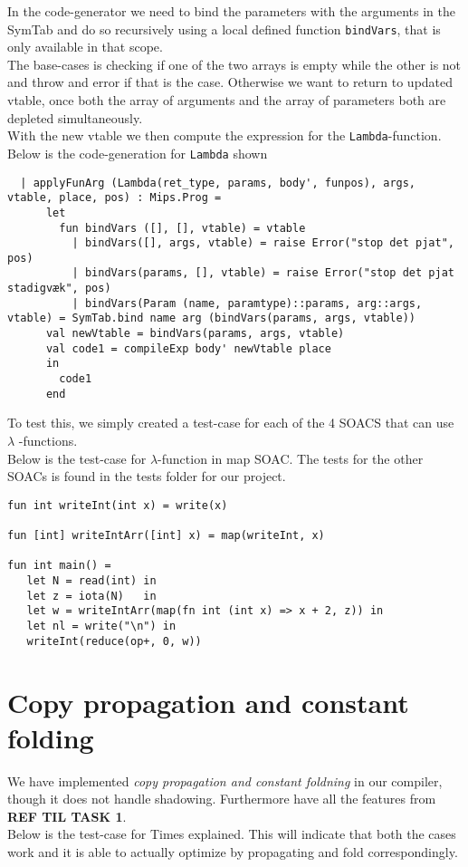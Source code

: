 \documentclass[paper=a4, fontsize=11pt]{scrartcl} %
\numberwithin{equation}{section} %
\numberwithin{figure}{section} %
\numberwithin{table}{section} %
\begin{document}
In the code-generator we need to bind the parameters with the arguments in the SymTab and do so recursively using a local defined function \verb"bindVars", that is only available in that scope.\\
The base-cases is checking if one of the two arrays is empty while the other is not and throw and error if that is the case. Otherwise we want to return to updated vtable, once both the array of arguments and the array of parameters both are depleted simultaneously.\\
With the new vtable we then compute the expression for the \verb"Lambda"-function.\\
Below is the code-generation for \verb"Lambda" shown
\begin{lstlisting}
  | applyFunArg (Lambda(ret_type, params, body', funpos), args, vtable, place, pos) : Mips.Prog = 
      let 
        fun bindVars ([], [], vtable) = vtable
          | bindVars([], args, vtable) = raise Error("stop det pjat", pos)
          | bindVars(params, [], vtable) = raise Error("stop det pjat stadigvæk", pos)
          | bindVars(Param (name, paramtype)::params, arg::args, vtable) = SymTab.bind name arg (bindVars(params, args, vtable))
      val newVtable = bindVars(params, args, vtable)
      val code1 = compileExp body' newVtable place
      in
        code1
      end
\end{lstlisting}

To test this, we simply created a test-case for each of the 4 SOACS that can use $\lambda$ -functions.\\

Below is the test-case for $\lambda$-function in map SOAC. The tests for the other SOACs is found in the tests folder for our project.
\begin{lstlisting}
fun int writeInt(int x) = write(x)

fun [int] writeIntArr([int] x) = map(writeInt, x)

fun int main() =
   let N = read(int) in
   let z = iota(N)   in
   let w = writeIntArr(map(fn int (int x) => x + 2, z)) in
   let nl = write("\n") in
   writeInt(reduce(op+, 0, w))
\end{lstlisting}

\section{Copy propagation and constant folding}

	We have implemented \textit{copy propagation and constant foldning} in our compiler, though it does not handle shadowing. Furthermore have all the features from \textbf{REF TIL TASK 1}.\\
Below is the test-case for Times  explained. This will indicate that both the cases work and it is able to actually optimize by propagating and fold correspondingly.\\
\end{document}
